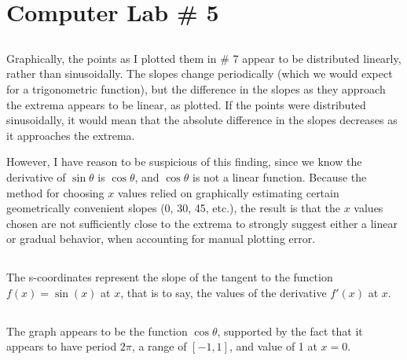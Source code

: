 \documentclass{article}
\begin{document}
\section*{Computer Lab \# 5}

\setcounter{subsection}{7}
\subsection{}
Graphically, the points as I plotted them in \# 7 appear to be distributed linearly, rather than sinusoidally. The slopes change periodically (which we would expect for a trigonometric function), but the difference in the slopes as they approach the extrema appears to be linear, as plotted.
If the points were distributed sinusoidally, it would mean that the absolute difference in the slopes decreases as it approaches the extrema.

However, I have reason to be suspicious of this finding, since we know the derivative of
 $\sin \theta$ is $\cos \theta$, and $\cos \theta$ is not a linear function.
  Because the method for choosing $x$ values relied on graphically
  estimating certain geometrically convenient slopes (0\textdegree, 30\textdegree, 45\textdegree, etc.), the
  result is that the $x$ values chosen are not sufficiently close to the extrema to strongly
  suggest either a linear or gradual behavior, when accounting for manual plotting error.

\subsection{}
The s-coordinates represent the slope of the tangent to the function $f(x)=\sin(x)$ at $x$, that is to say, the values of the derivative $f'(x)$ at $x$.

\subsection{}
The graph appears to be the function $\cos \theta$, supported by the fact that it appears to have period $2\pi$, a range of $[-1,1]$, and value of 1 at $x=0$.
\end{document}

